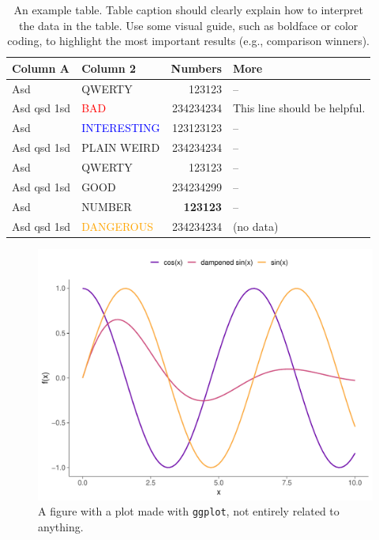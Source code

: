 \begin{table}
\centering\footnotesize\sf
\begin{tabular}{llrl}
\toprule
Column A & Column 2 & Numbers & More \\
\midrule
Asd & QWERTY & 123123 & -- \\
Asd qsd 1sd & \textcolor{red}{BAD} & 234234234 & This line should be helpful. \\
Asd & \textcolor{blue}{INTERESTING} & 123123123 & -- \\
Asd qsd 1sd & \textcolor{violet!50}{PLAIN WEIRD} & 234234234 & -- \\
Asd & QWERTY & 123123 & -- \\
\addlinespace %
Asd qsd 1sd & \textcolor{green!80!black}{GOOD} & 234234299 & -- \\
Asd & NUMBER & \textbf{123123} & -- \\
Asd qsd 1sd & \textcolor{orange}{DANGEROUS} & 234234234 & (no data) \\
\bottomrule
\end{tabular}
\caption{An example table.  Table caption should clearly explain how to interpret the data in the table. Use some visual guide, such as boldface or color coding, to highlight the most important results (e.g., comparison winners).}
\label{tab:z}
\end{table}

\begin{figure}
\centering
\includegraphics[width=.6\linewidth]{img/plot-example.pdf}
\caption{A figure with a plot made with \texttt{ggplot}, not entirely related to anything.}
\label{fig:g}
\end{figure}

